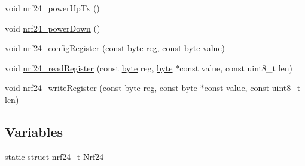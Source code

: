 \begin{DoxyCompactItemize}
\item 
void \hyperlink{a00013_a8aa77fbedb60ef1265f451dc400d1489}{nrf24\-\_\-power\-Up\-Tx} ()
\item 
void \hyperlink{a00013_ac7b63ad34704615c539accfd00a12ed5}{nrf24\-\_\-power\-Down} ()
\item 
void \hyperlink{a00013_a0e49f750814c96ce136993e1e5b17554}{nrf24\-\_\-config\-Register} (const \hyperlink{a00011_a82b52bf2b45e214a8f2100ebfdf1aee4}{byte} reg, const \hyperlink{a00011_a82b52bf2b45e214a8f2100ebfdf1aee4}{byte} value)
\item 
void \hyperlink{a00013_aeb0e11036d095aaeb49292ba3ef49cf1}{nrf24\-\_\-read\-Register} (const \hyperlink{a00011_a82b52bf2b45e214a8f2100ebfdf1aee4}{byte} reg, \hyperlink{a00011_a82b52bf2b45e214a8f2100ebfdf1aee4}{byte} $\ast$const value, const uint8\-\_\-t len)
\item 
void \hyperlink{a00013_a57a43ba04d8350624aae7da7c95579fe}{nrf24\-\_\-write\-Register} (const \hyperlink{a00011_a82b52bf2b45e214a8f2100ebfdf1aee4}{byte} reg, const \hyperlink{a00011_a82b52bf2b45e214a8f2100ebfdf1aee4}{byte} $\ast$const value, const uint8\-\_\-t len)
\end{DoxyCompactItemize}
\subsection*{Variables}
\begin{DoxyCompactItemize}
\item 
static struct \hyperlink{a00007}{nrf24\-\_\-t} \hyperlink{a00013_a3af53c3fdae3f9bf7246b30d2d66259f}{Nrf24}
\end{DoxyCompactItemize}


